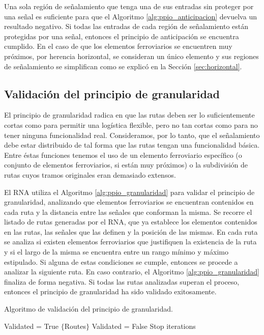 		Una sola región de señalamiento que tenga una de sus entradas sin proteger por una señal es suficiente para que el Algoritmo \ref{alg:ppio_anticipacion} devuelva un resultado negativo. Si todas las entradas de cada región de señalamiento están protegidas por una señal, entonces el principio de anticipación se encuentra cumplido. En el caso de que los elementos ferroviarios se encuentren muy próximos, por herencia horizontal, se consideran un único elemento y sus regiones de señalamiento se simplifican como se explicó en la Sección \ref{sec:horizontal}.
		
	\subsection{Validación del principio de granularidad}
		
		El principio de granularidad radica en que las rutas deben ser lo suficientemente cortas como para permitir una logística flexible, pero no tan cortas como para no tener ninguna funcionalidad real. Consideramos, por lo tanto, que el señalamiento debe estar distribuido de tal forma que las rutas tengan una funcionalidad básica. Entre éstas funciones tenemos el uso de un elemento ferroviario específico (o conjunto de elementos ferroviarios, si están muy próximos) o la subdivisión de rutas cuyos tramos originales eran demasiado extensos.
		
		El RNA utiliza el Algoritmo \ref{alg:ppio_granularidad} para validar el principio de granularidad, analizando que elementos ferroviarios se encuentran contenidos en cada ruta y la distancia entre las señales que conforman la misma. Se recorre el listado de rutas generadas por el RNA, que ya establece los elementos contenidos en las rutas, las señales que las definen y la posición de las mismas. En cada ruta se analiza si existen elementos ferroviarios que justifiquen la existencia de la ruta y si el largo de la misma se encuentra entre un rango mínimo y máximo estipulado. Si alguna de estas condiciones se cumple, entonces se procede a analizar la siguiente ruta. En caso contrario, el Algoritmo \ref{alg:ppio_granularidad} finaliza de forma negativa. Si todas las rutas analizadas superan el proceso, entonces el principio de granularidad ha sido validado exitosamente.
		
		\begin{algorithm}[hbt!]
			\caption{Algoritmo de validación del principio de granularidad.}\label{alg:ppio_granularidad}
			\DontPrintSemicolon
			\SetNoFillComment
			\LinesNotNumbered 
			Validated = True\;
			$\{$Routes$\}$\; 
			{
				{
					Validated = False\; 
					Stop iterations\;
				}				
			}
		\end{algorithm}
		
